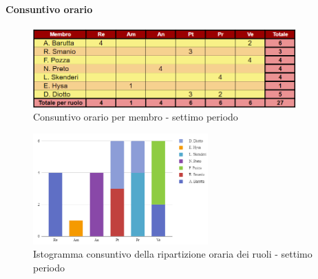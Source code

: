 \pagebreak

\paragraph{Consuntivo orario}

\begin{figure}[H]
    \centering
    \includegraphics[width=0.9\textwidth]{../Images/consuntivoOrario7Periodo.png}
    \caption{Consuntivo orario per membro - settimo periodo}
    \label{fig:Constuntivo_orario_7}
\end{figure}

\vspace{0.6cm}

\begin{figure}[H]
    \centering
    \includegraphics[width=0.6\textwidth]{../Images/consuntivoDivisioneRuoli7Periodo.png}
    \caption{Istogramma consuntivo della ripartizione oraria dei ruoli - settimo periodo}
    \label{fig:Consuntivo_ripartizione_oraria_7}
\end{figure}
